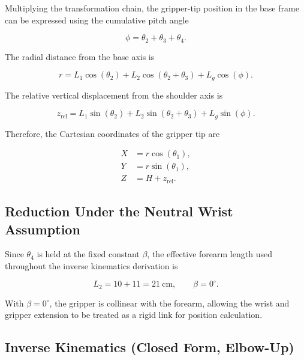 Multiplying the transformation chain, the gripper-tip position in the base frame can be expressed using the cumulative pitch angle

\begin{equation}
\phi = \theta_2+\theta_3+\theta_4.
\label{eq:phi}
\end{equation}

The radial distance from the base axis is

\begin{equation}
r =
L_1\cos(\theta_2)
+
L_2\cos(\theta_2+\theta_3)
+
L_g\cos(\phi).
\label{eq:radial}
\end{equation}

The relative vertical displacement from the shoulder axis is

\begin{equation}
z_{\mathrm{rel}} =
L_1\sin(\theta_2)
+
L_2\sin(\theta_2+\theta_3)
+
L_g\sin(\phi).
\label{eq:zrel}
\end{equation}

Therefore, the Cartesian coordinates of the gripper tip are

\begin{align}
X &= r\cos(\theta_1), \label{eq:x_position}\\
Y &= r\sin(\theta_1), \label{eq:y_position}\\
Z &= H+z_{\mathrm{rel}}. \label{eq:z_position}
\end{align}

\subsection{Reduction Under the Neutral Wrist Assumption}

Since $\theta_4$ is held at the fixed constant $\beta$, the effective forearm length used throughout the inverse kinematics derivation is

\begin{equation}
L_2 = 10+11 = 21~\mathrm{cm},
\qquad \beta=0^\circ.
\label{eq:effective_l2}
\end{equation}

With $\beta=0^\circ$, the gripper is collinear with the forearm, allowing the wrist and gripper extension to be treated as a rigid link for position calculation.

\subsection{Inverse Kinematics (Closed Form, Elbow-Up)}

